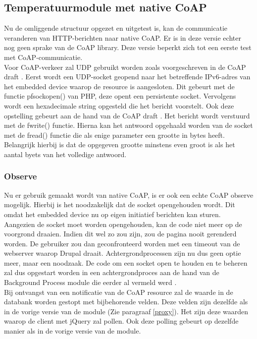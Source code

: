 \subsection{Temperatuurmodule met native CoAP}
Nu de omliggende structuur opgezet en uitgetest is, kan de communicatie veranderen van HTTP-berichten naar native CoAP. Er is in deze versie echter nog geen sprake van de CoAP library. Deze versie beperkt zich tot een eerste test met CoAP-communicatie.\\

Voor CoAP-verkeer zal UDP gebruikt worden zoals voorgeschreven in de CoAP draft \cite{coapDraft}. Eerst wordt een UDP-socket geopend naar het betreffende IPv6-adres van het embedded device waarop de resource is aangesloten. Dit gebeurt met de functie pfsockopen() van PHP, deze opent een persistente socket. Vervolgens wordt een hexadecimale string opgesteld die het bericht voorstelt. Ook deze opstelling gebeurt aan de hand van de CoAP draft \cite{coapDraft}. Het bericht wordt verstuurd met de fwrite() functie. Hierna kan het antwoord opgehaald worden van de socket met de fread() functie die als enige parameter een grootte in bytes heeft. Belangrijk hierbij is dat de opgegeven grootte minstens even groot is als het aantal byets van het volledige antwoord.\\

\subsubsection{Observe}
Nu er gebruik gemaakt wordt van native CoAP, is er ook een echte CoAP observe mogelijk. Hierbij is het noodzakelijk dat de socket opengehouden wordt. Dit omdat het embedded device nu op eigen initiatief berichten kan sturen. Aangezien de socket moet worden opengehouden, kan de code niet meer op de voorgrond draaien. Indien dit wel zo zou zijn, zou de pagina nooit gerenderd worden. De gebruiker zou dan geconfronteerd worden met een timeout van de webserver waarop Drupal draait. Achtergrondprocessen zijn nu dus geen optie meer, maar een noodzaak. De code om een socket open te houden en te beheren zal dus opgestart worden in een achtergrondproces aan de hand van de Background Process module die eerder al vermeld werd \cite{backgroundProcessModule}.\\
Bij ontvangst van een notificatie van de CoAP resource zal de waarde in de databank worden gestopt met bijbehorende velden. Deze velden zijn dezelfde als in de vorige versie van de module (Zie paragraaf \ref{proxy}). Het zijn deze waarden waarop de client met jQuery zal pollen. Ook deze polling gebeurt op dezelfde manier als in de vorige versie van de module.


